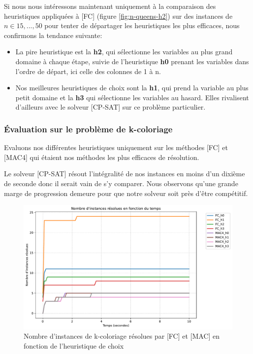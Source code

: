 \documentclass[14pt]{article}
\begin{document}
Si nous nous intéressons maintenant uniquement à la comparaison des heuristiques appliquées à [FC] (figure \ref{fig:n-queens-h2}) sur des instances de $n \in 15,...,50$ pour tenter de départager les heuristiques les plus efficaces, nous confirmons la tendance suivante:

\begin{itemize}
	\item La pire heuristique est la \textbf{h2}, qui sélectionne les variables au plus grand domaine à chaque étape, suivie de l'heuristique \textbf{h0} prenant les variables dans l'ordre de départ, ici celle des colonnes de 1 à n.
	\item Nos meilleures heuristiques de choix sont la \textbf{h1}, qui prend la variable au plus petit domaine et la \textbf{h3} qui sélectionne les variables au hasard. Elles rivalisent d'ailleurs avec le solveur [CP-SAT] sur ce problème particulier.
\end{itemize}


\subsubsection{Évaluation sur le problème de k-coloriage}

Evaluons nos différentes heuristiques uniquement sur les méthodes [FC] et [MAC4] qui étaient nos méthodes les plus efficaces de résolution.

Le solveur [CP-SAT] résout l'intégralité de nos instances en moins d'un dixième de seconde donc il serait vain de s'y comparer. Nous observons qu'une grande marge de progression demeure pour que notre solveur soit près d'être compétitif.

\begin{figure}[H]
	\centering
	\includegraphics[width=1\textwidth]{Images/graph_coloring-h.pdf}
	\caption{Nombre d'instances de k-coloriage résolues par [FC] et [MAC] en fonction de l'heuristique de choix}
	\label{fig:coloriage-h}
\end{figure}
\end{document}

